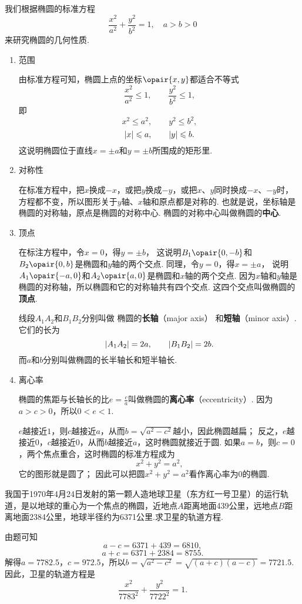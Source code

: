 我们根据椭圆的标准方程\[
\frac{x^2}{a^2} + \frac{y^2}{b^2} = 1,
\quad a > b > 0
\]来研究椭圆的几何性质.
\begin{enumerate}
\item 范围

由标准方程可知，椭圆上点的坐标\(\opair{x,y}\)都适合不等式\[
\frac{x^2}{a^2} \leqslant 1, \qquad \frac{y^2}{b^2} \leqslant 1,
\]即\[
x^2 \leqslant a^2, \qquad y^2 \leqslant b^2,
\]\[
\abs{x} \leqslant a, \qquad \abs{y} \leqslant b.
\]这说明椭圆位于直线\(x=\pm a\)和\(y=\pm b\)所围成的矩形里.

\item 对称性

在标准方程中，把\(x\)换成\(-x\)，或把\(y\)换成\(-y\)，或把\(x\)、\(y\)同时换成\(-x\)、\(-y\)时，%
方程都不变，所以图形关于\(y\)轴、\(x\)轴和原点都是对称的.
也就是说，坐标轴是椭圆的对称轴，原点是椭圆的对称中心.
椭圆的对称中心叫做椭圆的\textbf{中心}.

\item 顶点

在标注方程中，令\(x=0\)，得\(y=\pm b\)，%
这说明\(B_1\opair{0,-b}\)和\(B_2\opair{0,b}\)是椭圆和\(y\)轴的两个交点.
同理，令\(y=0\)，得\(x=\pm a\)，%
说明\(A_1\opair{-a,0}\)和\(A_2\opair{a,0}\)是椭圆和\(x\)轴的两个交点.
因为\(x\)轴和\(y\)轴是椭圆的对称轴，所以椭圆和它的对称轴共有四个交点.
这四个交点叫做椭圆的\textbf{顶点}.

线段\(A_1 A_2\)和\(B_1 B_2\)分别叫做%
椭圆的\textbf{长轴}（major axis）%
和\textbf{短轴}（minor axis）.
它们的长为\[
\abs{A_1 A_2} = 2a, \qquad \abs{B_1 B_2} = 2b.
\]而\(a\)和\(b\)分别叫做椭圆的长半轴长和短半轴长.

\item 离心率

椭圆的焦距与长轴长的比\(e = \frac{c}{a}\)叫做椭圆的\textbf{离心率}（eccentricity）.
因为\(a > c > 0\)，所以\(0 < e < 1\).

\(e\)越接近\(1\)，则\(c\)越接近\(a\)，从而\(b = \sqrt{a^2 - c^2}\)越小，因此椭圆越扁；
反之，\(e\)越接近\(0\)，\(c\)越接近\(0\)，从而\(b\)越接近\(a\)，这时椭圆就接近于圆.
如果\(a=b\)，则\(c=0\)，两个焦点重合，这时椭圆的标准方程成为\[
x^2 + y^2 = a^2,
\]
它的图形就是圆了；
因此可以把圆\(x^2+y^2=a^2\)看作离心率为\(0\)的椭圆.
\end{enumerate}

\begin{example}
我国于1970年4月24日发射的第一颗人造地球卫星（东方红一号卫星）的运行轨道，是以地球的重心为一个焦点的椭圆，近地点\(A\)距离地面439公里，远地点\(B\)距离地面2384公里，地球半径约为6371公里.求卫星的轨道方程.
\begin{solution}
由题可知\[
a - c = 6371 + 439 = 6810,
\]\[
a + c = 6371 + 2384 = 8755.
\]解得\(a=7782.5\)，\(c=972.5\)，所以\(b=\sqrt{a^2-c^2}=\sqrt{(a+c)(a-c)}=7721.5\).因此，卫星的轨道方程是\[
\frac{x^2}{7783^2}+\frac{y^2}{7722^2}=1.
\]
\end{solution}
\end{example}

